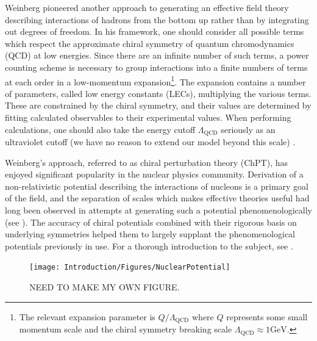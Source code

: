 Weinberg pioneered another approach to generating an effective field theory describing interactions of hadrons \cite{WEINBERG1990288} from the bottom up rather than by integrating out degrees of freedom. In his framework, one should consider all possible terms which respect the approximate chiral symmetry of quantum chromodynamics (QCD) at low energies. Since there are an infinite number of such terms, a power counting scheme is necessary to group interactions into a finite numbers of terms at each order in a low-momentum expansion\footnote{The relevant expansion parameter is $Q/\Lambda_{\text{QCD}}$ where $Q$ represents some small momentum scale and the chiral symmetry breaking scale $\Lambda_{\text{QCD}}\approx 1\text{GeV}$.}. The expansion contains a number of parameters, called low energy constants (LECs), multiplying the various terms. These are constrained by the chiral symmetry, and their values are determined by fitting calculated observables to their experimental values. When performing calculations, one should also take the energy cutoff $\Lambda_{\text{QCD}}$ seriously as an ultraviolet cutoff (we have no reason to extend our model beyond this scale) \cite{Epelbaum2013}. 

Weinberg's approach, referred to as chiral perturbation theory (ChPT), has enjoyed significant popularity in the nuclear physics community. Derivation of a non-relativistic potential describing the interactions of nucleons is a primary goal of the field, and the separation of scales which makes effective theories useful had long been observed in attempts at generating such a potential phenomenologically (see ). The accuracy of chiral potentials combined with their rigorous basis on underlying symmetries helped them to largely supplant the phenomenological potentials previously in use. For a thorough introduction to the subject, see \cite{Machleidt20111}.

\begin{figure}
\centering
\texttt{[image: Introduction/Figures/NuclearPotential]}
\caption[Separation of scales in the two-nucleon potential]{\label{fig:NuclearPotential} NEED TO MAKE MY OWN FIGURE.} 
\end{figure}

